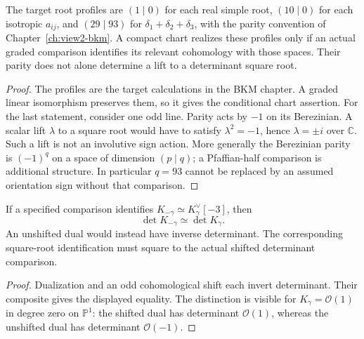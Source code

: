 \begin{proposition}
\label{prop:three-simple-wall-chart-orientation}
\label{prop:isotropic-aij-chart-orientation}
\label{prop:delta123-chart-orientation}
\label{prop:orientation-line-delta123-parity-compatibility}
The target root profiles are \((1\mid0)\) for each real simple root,
\((10\mid0)\) for each isotropic \(a_{ij}\), and \((29\mid93)\)
for \(\delta_1+\delta_2+\delta_3\), with the parity convention of
Chapter~\ref{ch:view2-bkm}.  A compact chart realizes these profiles only
if an actual graded comparison identifies its relevant cohomology
with those spaces.  Their parity does not alone determine a lift
to a determinant square root.
\end{proposition}
\begin{proof}
The profiles are the target calculations in the BKM chapter.  A
graded linear isomorphism preserves them, so it gives the conditional
chart assertion.  For the last statement, consider one odd line.
Parity acts by \(-1\) on its Berezinian.  A scalar lift \(\lambda\)
to a square root would have to satisfy \(\lambda^2=-1\), hence
\(\lambda=\pm i\) over \(\mathbb C\).  Such a lift is not an
involutive sign action.  More generally the Berezinian parity is
\((-1)^q\) on a space of dimension \((p\mid q)\); a Pfaffian-half
comparison is additional structure.  In particular \(q=93\) cannot
be replaced by an assumed orientation sign without that comparison.
\end{proof}

\begin{proposition}
\label{prop:orientation-line-negative-root-compatibility}
If a specified comparison identifies
\(K_{-\gamma}\simeq K_\gamma^\vee[-3]\), then
\[
 \det K_{-\gamma}\simeq\det K_\gamma.
\]
An unshifted dual would instead have inverse determinant.  The
corresponding square-root identification must square to the actual
shifted determinant comparison.
\end{proposition}
\begin{proof}
Dualization and an odd cohomological shift each invert determinant.
Their composite gives the displayed equality.  The distinction is
visible for \(K_\gamma=\mathcal O(1)\) in degree zero on
\(\mathbb P^1\): the shifted dual has determinant \(\mathcal O(1)\),
whereas the unshifted dual has determinant \(\mathcal O(-1)\).
\end{proof}

